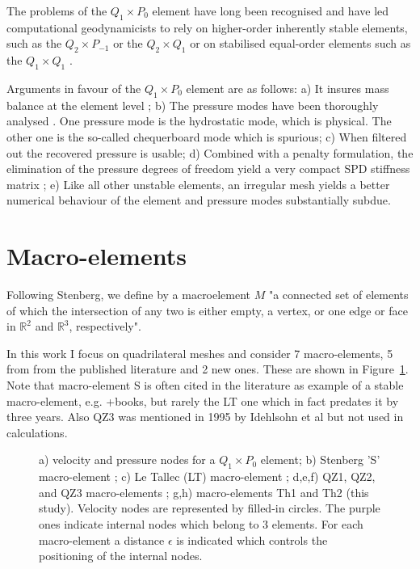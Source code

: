 \documentclass[a4paper]{article}
\begin{document}
The problems of the $Q_1\times P_0$ element have long been recognised 
and have led computational geodynamicists to rely on 
higher-order inherently stable elements, such as the $Q_2\times P_{-1}$ \cite{mabl15} or the 
$Q_2\times Q_1$ \cite{krhb12} or on stabilised equal-order elements such as the $Q_1\times Q_1$ \cite{busa13}.

Arguments in favour of the $Q_1\times P_0$ element are as follows:
a) It insures mass balance at the element level \cite[p459]{grsa};
b) The pressure modes have been thoroughly analysed \cite{sagl81a,sagl81b,grsi94}.
One pressure mode is the hydrostatic mode, which is  
physical. The other one is the so-called chequerboard mode which is spurious;
c) When filtered out \cite{chpc95} the recovered pressure is usable;
d) Combined with a penalty formulation, the elimination of the pressure degrees of freedom 
yield a very compact SPD stiffness matrix \cite{zigo75,hulb79,zina82,redd82,odks82};
e) Like all other unstable elements, an irregular mesh yields a 
better numerical behaviour of the element \cite{qizh07} and pressure modes substantially subdue.







\section{Macro-elements}\label{sec3}

Following Stenberg\cite{sten90}, we define by a macroelement $M$ "a connected set of elements of which the 
intersection of any two is either empty, a vertex, or one edge or face in $\mathbb{R}^2$ 
and $\mathbb{R}^3$, respectively".

In this work I focus on quadrilateral meshes and consider 7 
macro-elements, 5 from from the published literature and 2 new ones. These are shown in Figure~\ref{fig:mes}.
Note that macro-element S is often cited in the literature as example of a stable macro-element, 
e.g. \cite{chba93}+books, but rarely the LT one which in fact predates it by three years. 
Also QZ3 was mentioned in 1995 by Idehlsohn et al \cite{idsn95} but not used in calculations. 

\begin{figure}[t]

\caption{
a) velocity and pressure nodes for a $Q_1\times P_0$ element;
b) Stenberg 'S' macro-element \cite{sten84}; 
c) Le Tallec (LT) macro-element \cite{leta81,leru86}; 
d,e,f) QZ1, QZ2, and QZ3 macro-elements \cite{qizh07}; 
g,h) macro-elements Th1 and Th2 (this study).
Velocity nodes are represented by filled-in circles. The purple ones indicate internal nodes which belong to 3 elements.
For each macro-element a distance $\epsilon$ is indicated which controls the positioning of the internal nodes.
\label{fig:mes}}
\end{figure}
\end{document}
